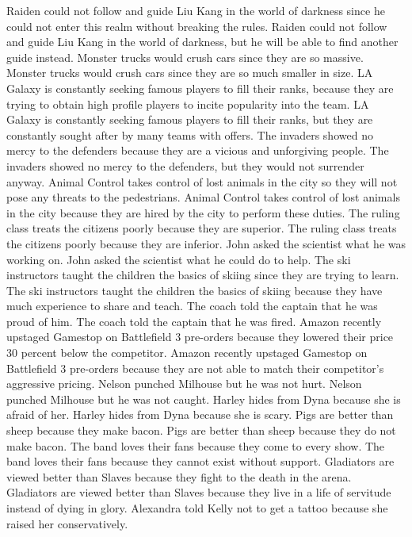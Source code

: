 \documentclass{article}
\begin{document}
\begin{enumerate}
Raiden could not follow and guide Liu Kang in the world of darkness since he could not enter this realm without breaking the rules.
Raiden could not follow and guide Liu Kang in the world of darkness, but he will be able to find another guide instead.
Monster trucks would crush cars since they are so massive.
Monster trucks would crush cars since they are so much smaller in size.
LA Galaxy is constantly seeking famous players to fill their ranks, because they are trying to obtain high profile players to incite popularity into the team.
LA Galaxy is constantly seeking famous players to fill their ranks, but they are constantly sought after by many teams with offers.
The invaders showed no mercy to the defenders because they are a vicious and unforgiving people.
The invaders showed no mercy to the defenders, but they would not surrender anyway.
Animal Control takes control of lost animals in the city so they will not pose any threats to the pedestrians.
Animal Control takes control of lost animals in the city because they are hired by the city to perform these duties.
The ruling class treats the citizens poorly because they are superior.
The ruling class treats the citizens poorly because they are inferior.
John asked the scientist what he was working on.
John asked the scientist what he could do to help.
The ski instructors taught the children the basics of skiing since they are trying to learn.
The ski instructors taught the children the basics of skiing because they have much experience to share and teach.
The coach told the captain that he was proud of him.
The coach told the captain that he was fired.
Amazon recently upstaged Gamestop on Battlefield 3 pre-orders because they lowered their price 30 percent below the competitor.
Amazon recently upstaged Gamestop on Battlefield 3 pre-orders because they are not able to match their competitor's aggressive pricing.
Nelson punched Milhouse but he was not hurt.
Nelson punched Milhouse but he was not caught.
Harley hides from Dyna because she is afraid of her.
Harley hides from Dyna because she is scary.
Pigs are better than sheep because they make bacon.
Pigs are better than sheep because they do not make bacon.
The band loves their fans because they come to every show.
The band loves their fans because they cannot exist without support.
Gladiators are viewed better than Slaves because they fight to the death in the arena.
Gladiators are viewed better than Slaves because they live in a life of servitude instead of dying in glory.
Alexandra told Kelly not to get a tattoo because she raised her conservatively.

\end{enumerate}
\end{document}
